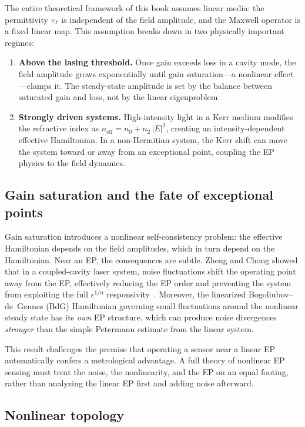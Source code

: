The entire theoretical framework of this book assumes linear media: the
permittivity $\varepsilon_{\mathrm{r}}$ is independent of the field amplitude, and the
Maxwell operator is a fixed linear map. This assumption breaks down in
two physically important regimes:
\begin{enumerate}
 \item \textbf{Above the lasing threshold.} Once gain exceeds loss in
 a cavity mode, the field amplitude grows exponentially until gain
 saturation---a nonlinear effect---clamps it. The steady-state
 amplitude is set by the balance between saturated gain and loss,
 not by the linear eigenproblem.
 \item \textbf{Strongly driven systems.} High-intensity light in a
 Kerr medium modifies the refractive index as
 $n_{\mathrm{eff}} = n_0 + n_2\,|E|^2$, creating an
 intensity-dependent effective Hamiltonian. In a non-Hermitian system,
 the Kerr shift can move the system toward or away from an exceptional
 point, coupling the EP physics to the field dynamics.
\end{enumerate}

\subsection{Gain saturation and the fate of exceptional points}
\label{ssec:gain-saturation-open}

Gain saturation introduces a nonlinear self-consistency problem: the
effective Hamiltonian depends on the field amplitudes, which in turn
depend on the Hamiltonian. Near an EP, the consequences are subtle.
Zheng and Chong showed that in a coupled-cavity laser system, noise
fluctuations shift the operating point away from the EP, effectively
reducing the EP order and preventing the system from exploiting the full
$\epsilon^{1/n}$ responsivity~\cite{zheng2024noise}. Moreover, the
linearized Bogoliubov--de~Gennes (BdG) Hamiltonian governing small fluctuations
around the nonlinear steady state has its \emph{own} EP structure, which
can produce noise divergences \emph{stronger} than the simple Petermann
estimate from the linear system.

This result challenges the premise that operating a sensor near a linear
EP automatically confers a metrological advantage. A full theory of
nonlinear EP sensing must
treat the noise, the nonlinearity, and the EP on an equal footing,
rather than analyzing the linear EP first and adding noise afterward.

\subsection{Nonlinear topology}
\label{ssec:nonlinear-topology}


